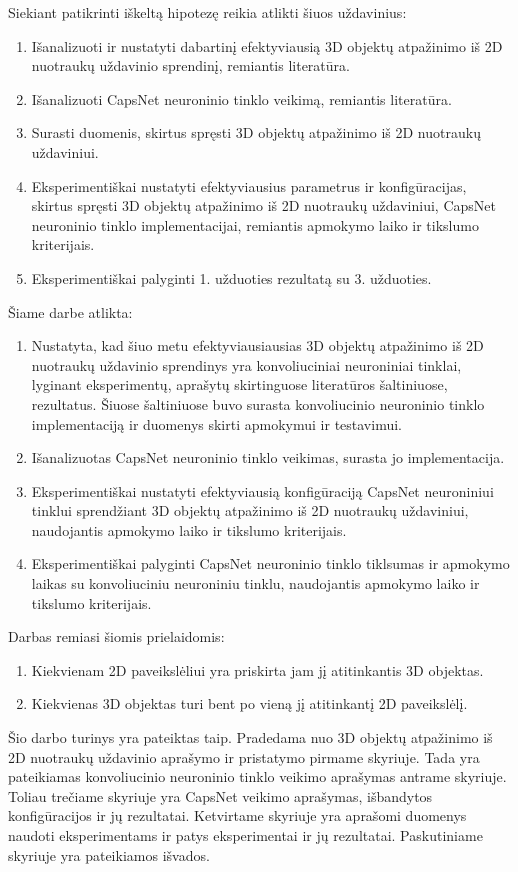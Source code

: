 Siekiant patikrinti iškeltą hipotezę reikia atlikti šiuos uždavinius:

\begin{enumerate}
	\item Išanalizuoti ir nustatyti dabartinį efektyviausią 3D objektų atpažinimo iš 2D nuotraukų uždavinio sprendinį, remiantis literatūra.
	\item Išanalizuoti CapsNet neuroninio tinklo veikimą, remiantis literatūra.
	\item Surasti duomenis, skirtus spręsti 3D objektų atpažinimo iš 2D nuotraukų uždaviniui.
	\item Eksperimentiškai nustatyti efektyviausius parametrus ir konfigūracijas, skirtus spręsti 3D objektų atpažinimo iš 2D nuotraukų uždaviniui, CapsNet neuroninio tinklo implementacijai, remiantis apmokymo laiko ir tikslumo kriterijais.
	\item Eksperimentiškai palyginti 1. užduoties rezultatą su 3. užduoties.
\end{enumerate}

Šiame darbe atlikta:

\begin{enumerate}
	\item Nustatyta, kad šiuo metu efektyviausiausias 3D objektų atpažinimo iš 2D nuotraukų uždavinio sprendinys yra konvoliuciniai neuroniniai tinklai, lyginant eksperimentų, aprašytų skirtinguose literatūros šaltiniuose, rezultatus. Šiuose šaltiniuose buvo surasta konvoliucinio neuroninio tinklo implementaciją ir duomenys skirti apmokymui ir testavimui.
	\item Išanalizuotas CapsNet neuroninio tinklo veikimas, surasta jo implementacija.
	\item Eksperimentiškai nustatyti efektyviausią konfigūraciją CapsNet neuroniniui tinklui sprendžiant 3D objektų atpažinimo iš 2D nuotraukų uždaviniui, naudojantis apmokymo laiko ir tikslumo kriterijais.
	\item Eksperimentiškai palyginti CapsNet neuroninio tinklo tiklsumas ir apmokymo laikas su konvoliuciniu neuroniniu tinklu, naudojantis apmokymo laiko ir tikslumo kriterijais.
\end{enumerate}

Darbas remiasi šiomis prielaidomis:

\begin{enumerate}
	\item Kiekvienam 2D paveikslėliui yra priskirta jam jį atitinkantis 3D objektas.
	\item Kiekvienas 3D objektas turi bent po vieną jį atitinkantį 2D paveikslėlį.
\end{enumerate}

Šio darbo turinys yra pateiktas taip. Pradedama nuo 3D objektų atpažinimo iš 2D nuotraukų uždavinio aprašymo ir pristatymo pirmame skyriuje. Tada yra pateikiamas konvoliucinio neuroninio tinklo veikimo aprašymas antrame skyriuje. Toliau trečiame skyriuje yra CapsNet veikimo aprašymas, išbandytos konfigūracijos ir jų rezultatai. Ketvirtame skyriuje yra aprašomi duomenys naudoti eksperimentams ir patys eksperimentai ir jų rezultatai. Paskutiniame skyriuje yra pateikiamos išvados.
